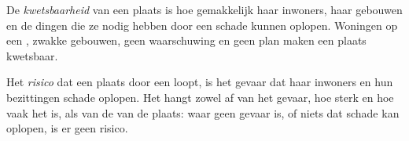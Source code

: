 \begin{definition}[Kwetsbaarheid]\label{def:g9:natural-risks:vulnerability}
De \emph{kwetsbaarheid} van een plaats is hoe
gemakkelijk haar inwoners, haar gebouwen en de dingen die ze nodig hebben
door een  schade kunnen oplopen. Woningen op een
, zwakke gebouwen, geen waarschuwing en geen plan
maken een plaats kwetsbaar.
\end{definition}

\begin{definition}[Risico]\label{def:g9:natural-risks:risk}
Het \emph{risico} dat een plaats door een  loopt,
is het gevaar dat haar inwoners en hun bezittingen schade oplopen. Het
hangt zowel af van het gevaar, hoe sterk en hoe vaak het is, als van de
 van de plaats: waar geen gevaar is, of niets dat schade kan
oplopen, is er geen risico.
\end{definition}

